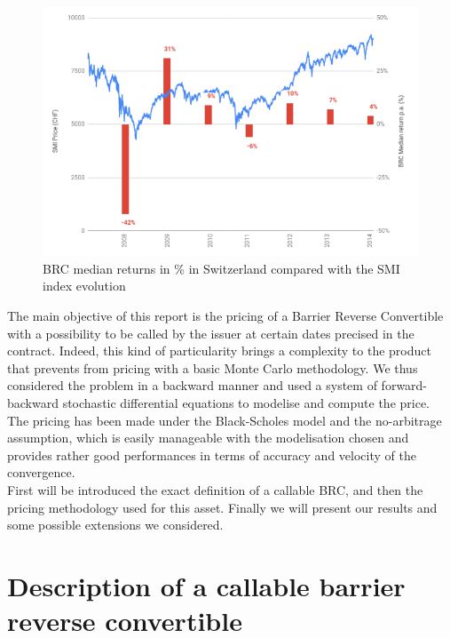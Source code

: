 \documentclass[a4paper,11pt,english]{book}
\begin{document}
\begin{figure}[H] 
    \centering
    \includegraphics[scale=0.35]{images/BRC_median_return.png} 
    \caption{BRC median returns in \% in Switzerland compared with the SMI index evolution}
    \label{fig:median-returns-BRC}
\end{figure}

The main objective of this report is the pricing of a Barrier Reverse Convertible with a possibility to be called by the issuer at certain dates precised in the contract. Indeed, this kind of particularity brings a complexity to the product that prevents from pricing with a basic Monte Carlo methodology. We thus considered the problem in a backward manner and used a system of forward-backward stochastic differential equations to modelise and compute the price. The pricing has been made under the Black-Scholes model and the no-arbitrage assumption, which is easily manageable with the modelisation chosen and provides rather good performances in terms of accuracy and velocity of the convergence. \\

First will be introduced the exact definition of a callable BRC, and then the pricing methodology used for this asset. Finally we will present our results and some possible extensions we considered.  




\pagestyle{fancy}

\chapter{Description of a callable barrier reverse convertible}
\end{document}
